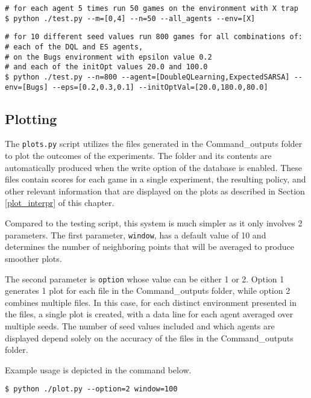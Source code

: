 \begin{center}
\hrulefill
\begin{lstlisting}
# for each agent 5 times run 50 games on the environment with X trap
$ python ./test.py --m=[0,4] --n=50 --all_agents --env=[X]
\end{lstlisting}
\hrulefill
\end{center}

\begin{center}
\hrulefill
\begin{lstlisting}
# for 10 different seed values run 800 games for all combinations of:
# each of the DQL and ES agents,
# on the Bugs environment with epsilon value 0.2
# and each of the initOpt values 20.0 and 100.0
$ python ./test.py --n=800 --agent=[DoubleQLearning,ExpectedSARSA] --env=[Bugs] --eps=[0.2,0.3,0.1] --initOptVal=[20.0,180.0,80.0]
\end{lstlisting}
\hrulefill
\end{center}

\subsection{Plotting}

The \texttt{plots.py} script utilizes the files generated in the Command\_outputs folder to plot the outcomes of the experiments. The folder and its contents are automatically produced when the write option of the database is enabled. These files contain scores for each game in a single experiment, the resulting policy, and other relevant information that are displayed on the plots as described in Section \ref{plot_interpr} of this chapter.

Compared to the testing script, this system is much simpler as it only involves 2 parameters. The first parameter, \texttt{window}, has a default value of 10 and determines the number of neighboring points that will be averaged to produce smoother plots.

The second parameter is \texttt{option} whose value can be either 1 or 2. Option 1 generates 1 plot for each file in the Command\_outputs folder, while option 2 combines multiple files. In this case, for each distinct environment presented in the files, a single plot is created, with a data line for each agent averaged over multiple seeds. The number of seed values included and which agents are displayed depend solely on the accuracy of the files in the Command\_outputs folder.

Example usage is depicted in the command below.

\begin{center}
\hrulefill
\begin{lstlisting}
$ python ./plot.py --option=2 window=100
\end{lstlisting}
\hrulefill
\end{center}
